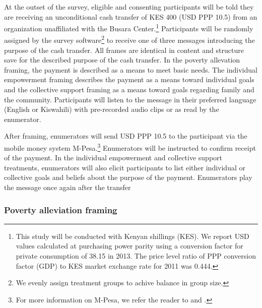 \documentclass[11pt, a4paper]{article}\usepackage[]{graphicx}\usepackage[]{color}
\begin{document}
        At the outset of the survey, eligible and consenting participants will be told they are receiving an unconditional cash transfer of KES 400 (USD PPP 10.5) from an organization unaffiliated with the Busara Center.\footnote{This study will be conducted with Kenyan shillings (KES). We report USD values calculated at purchasing power parity using a conversion factor for private consumption of 38.15 in 2013. The price level ratio of PPP conversion factor (GDP) to KES market exchange rate for 2011 was 0.444.} Participants will be randomly assigned by the survey software\footnote{We evenly assign treatment groups to achive balance in group size.} to receive one of three messages introducing the purpose of the cash transfer. All frames are identical in content and structure save for the described purpose of the cash transfer. In the poverty allevation framing, the payment is described as a means to meet basic needs. The individual empowerment framing describes the payment as a means toward individual goals and the collective support framing as a means toward goals regarding family and the community. Participants will listen to the message in their preferred language (English or Kiswahili) with pre-recorded audio clips or as read by the enumerator.

        After framing, enumerators will send USD PPP 10.5 to the participant via the mobile money system M-Pesa.\footnote{For more information on M-Pesa, we refer the reader to \textcite{jack_mobile_2011} and \textcite{mbiti_mobile_2011}.} Enumerators will be instructed to confirm receipt of the payment. In the individual empowerment and collective support treatments, enumerators will also elicit participants to list either individual or collective goals and beliefs about the purpose of the payment. Enumerators play the message once again after the transfer


        \subsubsection{Poverty alleviation framing}
\end{document}
